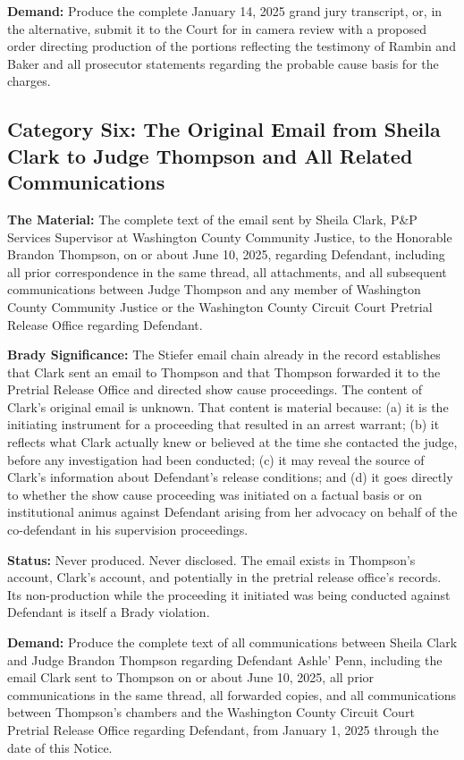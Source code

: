 \documentclass[12pt,letterpaper]{extarticle}
\begin{document}
	\textbf{Demand:} Produce the complete January 14, 2025 grand jury transcript,
	or, in the alternative, submit it to the Court for in camera review with a
	proposed order directing production of the portions reflecting the testimony
	of Rambin and Baker and all prosecutor statements regarding the probable cause
	basis for the charges.
	
	\subsection{Category Six: The Original Email from Sheila Clark to Judge Thompson
		and All Related Communications}
	
	\textbf{The Material:} The complete text of the email sent by Sheila Clark,
	P\&P Services Supervisor at Washington County Community Justice, to the Honorable
	Brandon Thompson, on or about June 10, 2025, regarding Defendant, including all
	prior correspondence in the same thread, all attachments, and all subsequent
	communications between Judge Thompson and any member of Washington County Community
	Justice or the Washington County Circuit Court Pretrial Release Office regarding
	Defendant.
	
	\textbf{Brady Significance:} The Stiefer email chain already in the record
	establishes that Clark sent an email to Thompson and that Thompson forwarded it to
	the Pretrial Release Office and directed show cause proceedings. The content of
	Clark's original email is unknown. That content is material because: (a) it is the
	initiating instrument for a proceeding that resulted in an arrest warrant; (b) it
	reflects what Clark actually knew or believed at the time she contacted the judge,
	before any investigation had been conducted; (c) it may reveal the source of
	Clark's information about Defendant's release conditions; and (d) it goes directly
	to whether the show cause proceeding was initiated on a factual basis or on
	institutional animus against Defendant arising from her advocacy on behalf of the
	co-defendant in his supervision proceedings.
	
	\textbf{Status:} Never produced. Never disclosed. The email exists in Thompson's
	account, Clark's account, and potentially in the pretrial release office's records.
	Its non-production while the proceeding it initiated was being conducted against
	Defendant is itself a Brady violation.
	
	\textbf{Demand:} Produce the complete text of all communications between Sheila
	Clark and Judge Brandon Thompson regarding Defendant Ashle' Penn, including the
	email Clark sent to Thompson on or about June 10, 2025, all prior communications
	in the same thread, all forwarded copies, and all communications between Thompson's
	chambers and the Washington County Circuit Court Pretrial Release Office regarding
	Defendant, from January 1, 2025 through the date of this Notice.
	
\end{document}
